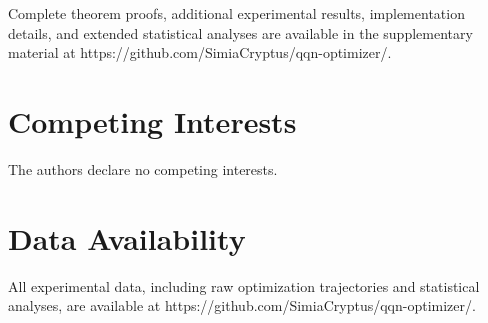 Complete theorem proofs, additional experimental results, implementation details, and extended statistical analyses are available in the supplementary material at https://github.com/SimiaCryptus/qqn-optimizer/.

\hypertarget{competing-interests}{%
\section{Competing Interests}\label{competing-interests}}

The authors declare no competing interests.

\hypertarget{data-availability}{%
\section{Data Availability}\label{data-availability}}

All experimental data, including raw optimization trajectories and statistical analyses, are available at https://github.com/SimiaCryptus/qqn-optimizer/.
